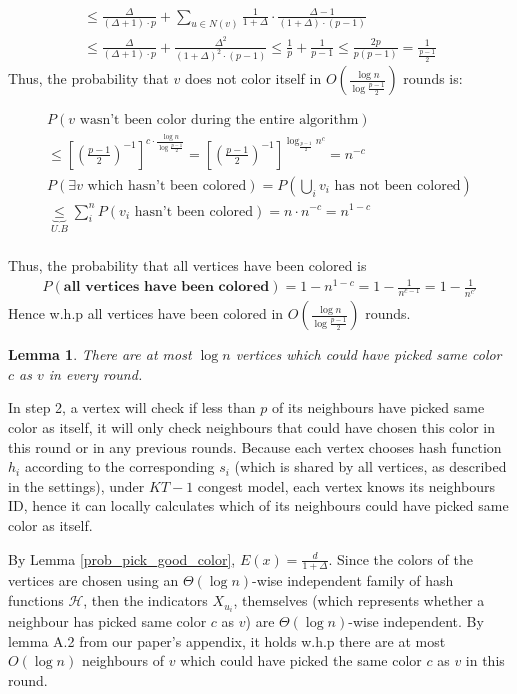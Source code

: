 \documentclass[11pt]{article}
\newtheorem{lemma}{Lemma}
\begin{document}
\begin{gather*}
\le \frac{\Delta}{(\Delta + 1) \cdot p} + \sum_{u \in N(v)}{\frac{1}{1 + \Delta} \cdot \frac{\Delta-1}{(1+ \Delta) \cdot (p-1)} } \\
\le \frac{\Delta}{(\Delta + 1) \cdot p} + \frac{\Delta^2}{(1 + \Delta)^2 \cdot (p-1)}
\le \frac{1}{p} + \frac{1}{p-1} \le \frac{2p}{p(p-1)} = \frac{1}{\frac{p-1}{2}}
\end{gather*}
Thus, the probability that $v$ does not color itself in $O(\frac{\log{n}}{\log{\frac{p-1}{2}}})$ rounds is:

\begin{gather*}
P(v \text{ wasn't been color during the entire algorithm}) \\ 
\le [(\frac{p-1}{2})^{-1}]^{c \cdot \frac{\log{n}}{\log{\frac{p-1}{2}}}}
= [(\frac{p-1}{2})^{-1}]^{\log_{\frac{p-1}{2}}{n^c}}= n^{-c} \\
P(\exists v \text{ which hasn't been colored}) = P(\bigcup_{i} v_i \text{ has not been colored}) \\
\underset{U.B}{\underbrace{\le}} \sum_{i}^{n} P(v_i \text{ hasn't been colored}) = n \cdot n^{-c} = n^{1-c} \\
\end{gather*}

Thus, the probability that all vertices have been colored is
\begin{gather*}
P(\textbf{all vertices have been colored}) = 1 - n^{1-c} = 1 - \frac{1}{n^{c-1}} = 1 - \frac{1}{n^{c'}}
\end{gather*}
Hence w.h.p all vertices have been colored in  $O(\frac{\log{n}}{\log{\frac{p-1}{2}}})$ rounds. 

\begin{lemma}
\label{colors_conflict}
There are at most $\log{n}$ vertices which could have picked same color $c$ as $v$ in every round.
\end{lemma}
In step 2, a vertex will check if less than $p$ of its neighbours have picked same color as itself, it will only check neighbours that could have chosen this color in this round or in any previous rounds. Because each vertex chooses hash function $h_i$ according to the corresponding $s_i$ (which is shared by all vertices, as described in the settings), under $KT-1$ congest model, each vertex knows its neighbours ID, hence it can locally calculates which of its neighbours could have picked same color as itself.

By Lemma \ref{prob_pick_good_color}, $E(x) = \frac{d}{1 + \Delta}$. Since the colors of the vertices are chosen using an $\Theta(\log{n})$-wise independent family of hash functions $\mathcal{H}$, then the indicators $X_{u_i}$, themselves (which represents whether a neighbour has picked same color $c$ as $v$) are $\Theta(\log{n})$-wise independent. By lemma A.2 from our paper's appendix, it holds w.h.p there are at most $O(\log{n})$ neighbours of $v$ which could have picked the same color $c$ as $v$ in this round.
\end{document}
